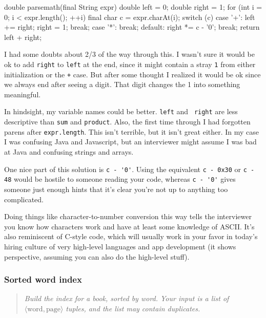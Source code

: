 \documentclass{article}
\begin{document}
\begin{javacode}
double parsemath(final String expr) {
  double left  = 0;
  double right = 1;
  for (int i = 0; i < expr.length(); ++i) {
    final char c = expr.charAt(i);
    switch (c) {
      case '+':
        left += right;
        right = 1;
        break;
      case '*':
        break;
      default:
        right *= c - '0';
        break;
    }
  }
  return left + right;
} \end{javacode}

      I had some doubts about 2/3 of the way through this. I wasn't sure it
      would be ok to add {\tt right} to {\tt left} at the end, since it might
      contain a stray {\tt 1} from either initialization or the {\tt +} case.
      But after some thought I realized it would be ok since we always end
      after seeing a digit. That digit changes the 1 into something meaningful.

      In hindsight, my variable names could be better. {\tt left} and {\tt
      right} are less descriptive than {\tt sum} and {\tt product}. Also, the
      first time through I had forgotten parens after {\tt expr.length}. This
      isn't terrible, but it isn't great either. In my case I was confusing
      Java and Javascript, but an interviewer might assume I was bad at Java
      and confusing strings and arrays.

      One nice part of this solution is \verb|c - '0'|. Using the equivalent
      \verb|c - 0x30| or \verb|c - 48| would be hostile to someone reading your
      code, whereas \verb|c - '0'| gives someone just enough hints that it's
      clear you're not up to anything too complicated.

      Doing things like character-to-number conversion this way tells the
      interviewer you know how characters work and have at least some knowledge
      of ASCII. It's also reminiscent of C-style code, which will usually work
      in your favor in today's hiring culture of very high-level languages and
      app development (it shows perspective, assuming you can also do the
      high-level stuff).

\subsubsection{Sorted word index}
\begin{quote}
\em
Build the index for a book, sorted by word. Your input is a list of
$\langle \textrm{word}, \textrm{page} \rangle$ tuples, and the list may
contain duplicates.
\end{quote}
\end{document}
